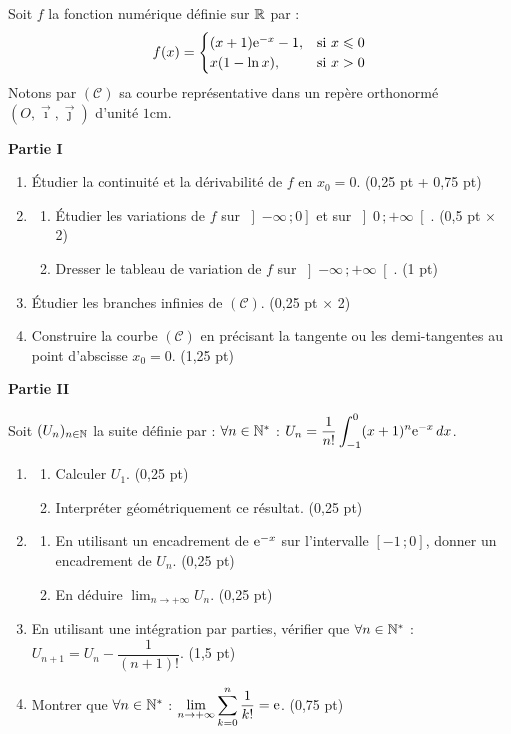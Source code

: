 

Soit $f$ la fonction numérique définie sur $\mathbb{R}$ par :
$$
f(x) =
\begin{cases}
	(x+1)\mathrm{e}^{-x} - 1, & \text{si } x \leqslant 0 \\
	x(1-\ln x), & \text{si } x > 0
\end{cases}
$$
Notons par $(\mathscr{C})$ sa courbe représentative dans un repère orthonormé $(O,\vec{\imath},\vec{\jmath})$ d'unité $1\text{cm}$.

\medskip
\noindent\textbf{Partie I}

\begin{enumerate}
	\item Étudier la continuité et la dérivabilité de $f$ en $x_0 = 0$. \hfill (0,25 pt + 0,75 pt)
	\item
	\begin{enumerate}
		\item Étudier les variations de $f$ sur $\left]-\infty\,;0\right]$ et sur $\left]0\,;+\infty\right[$. \hfill (0,5 pt $\times$ 2)
		\item Dresser le tableau de variation de $f$ sur $\left]-\infty\,;+\infty\right[$. \hfill (1 pt)
	\end{enumerate}
	\item Étudier les branches infinies de $(\mathscr{C})$. \hfill (0,25 pt $\times$ 2)
	\item Construire la courbe $(\mathscr{C})$ en précisant la tangente ou les demi-tangentes au point d'abscisse $x_0 = 0$. \hfill (1,25 pt)
\end{enumerate}

\medskip
\noindent\textbf{Partie II}

Soit $(U_n)_{n\in\mathbb{N}}$ la suite définie par : $\forall n \in \mathbb{N}^*$ : $U_n = \dfrac{1}{n!}\displaystyle\int_{-1}^{0} (x+1)^n \mathrm{e}^{-x}\,dx$.

\begin{enumerate}
	\item
	\begin{enumerate}
		\item Calculer $U_1$. \hfill (0,25 pt)
		\item Interpréter géométriquement ce résultat. \hfill (0,25 pt)
	\end{enumerate}
	\item
	\begin{enumerate}
		\item En utilisant un encadrement de $\mathrm{e}^{-x}$ sur l'intervalle $[-1\,;0]$, donner un encadrement de $U_n$. \hfill (0,25 pt)
		\item En déduire $\displaystyle\lim_{n\to+\infty} U_n$. \hfill (0,25 pt)
	\end{enumerate}
	\item En utilisant une intégration par parties, vérifier que $\forall n \in \mathbb{N}^*$ : $U_{n+1} = U_n - \dfrac{1}{(n+1)!}$. \hfill (1,5 pt)
	\item Montrer que $\forall n \in \mathbb{N}^*$ : $\displaystyle\lim_{n\to+\infty} \sum_{k=0}^{n} \frac{1}{k!} = \mathrm{e}$. \hfill (0,75 pt)
\end{enumerate}
